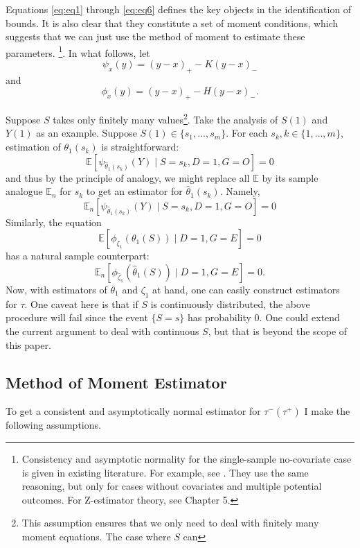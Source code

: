 \documentclass[12pt]{article}
\newcommand{\Ep}{\mathbb{E}}
\begin{document}
	Equations \ref{eq:eq1} through \ref{eq:eq6} defines the key objects in the identification of bounds. It is also clear that they constitute a set of moment conditions, which suggests that we can just use the method of moment to estimate these parameters.
	\footnote{Consistency and asymptotic normality for the single-sample no-covariate case is given in existing literature. For example, see \textcite{yadlowsky2018bounds}. They use the same reasoning, but only for cases without covariates and multiple potential outcomes. For Z-estimator theory, see \textcite{van2000asymptotic} Chapter 5.}. In what follows, let $$\psi_x(y) = (y - x)_+ - K (y - x)_-$$ and $$\phi_x(y) = (y - x)_+ - H (y - x)_-.$$
	
	Suppose $S$ takes only finitely many values\footnote{This assumption ensures that we only need to deal with finitely many moment equations. The case where $S$ can }. Take the analysis of $S(1)$ and $Y(1)$ as an example. Suppose $S(1) \in \{s_1,\ldots, s_m\}$. For each $s_k, k\in\{1,\ldots,m\}$, estimation of $\theta_1(s_k)$ is straightforward:
	$$
	\mathbb{E}\left[\psi_{\hat{\theta}_1(s_k)}(Y) \mid S = s_k, D=1, G = O\right] = 0
	$$
	and thus by the principle of analogy, we might replace all $\Ep$ by its sample analogue $\Ep_n$ for $s_k$ to get an estimator for $\hat{\theta}_1(s_k)$. Namely, 
	$$
    \mathbb{E}_n\left[\psi_{\hat{\theta}_1(s_k)}(Y) \mid S = s_k, D=1, G=O\right] = 0
	$$
	Similarly, the equation 
	\begin{equation*}
	\mathbb{E}\left[\phi_{{\zeta}_1}(\theta_1(S)) \mid D=1,G=E\right] = 0
	\end{equation*} 
	has a natural sample counterpart:
	\begin{equation*}
	\mathbb{E}_n\left[\phi_{\hat{\zeta}_1}(\hat{\theta}_1(S)) \mid D=1, G=E\right] = 0.
	\end{equation*}
	Now, with estimators of $\theta_1$ and $\zeta_1$ at hand, one can easily construct estimators for $\tau$. One caveat here is that if $S$ is continuously distributed, the above procedure will fail since the event $\{S = s\}$ has probability 0. One could extend the current argument to deal with continuous $S$, but that is beyond the scope of this paper.
	
	\subsection{Method of Moment Estimator}
	To get a consistent and asymptotically normal estimator for $\tau^-(\tau^+)$ I make the following assumptions.
	
\end{document}
